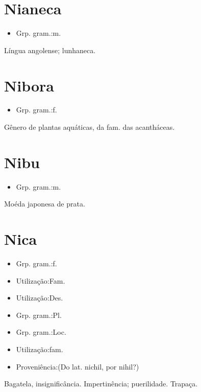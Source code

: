 \section{Nianeca}
\begin{itemize}
\item {Grp. gram.:m.}
\end{itemize}
Língua angolense; lunhaneca.
\section{Nibora}
\begin{itemize}
\item {Grp. gram.:f.}
\end{itemize}
Gênero de plantas aquáticas, da fam. das acantháceas.
\section{Nibu}
\begin{itemize}
\item {Grp. gram.:m.}
\end{itemize}
Moéda japonesa de prata.
\section{Nica}
\begin{itemize}
\item {Grp. gram.:f.}
\end{itemize}
\begin{itemize}
\item {Utilização:Fam.}
\end{itemize}
\begin{itemize}
\item {Utilização:Des.}
\end{itemize}
\begin{itemize}
\item {Grp. gram.:Pl.}
\end{itemize}
\begin{itemize}
\item {Grp. gram.:Loc.}
\end{itemize}
\begin{itemize}
\item {Utilização:fam.}
\end{itemize}
\begin{itemize}
\item {Proveniência:(Do lat. \textunderscore nichil\textunderscore , por \textunderscore nihil\textunderscore ?)}
\end{itemize}
Bagatela, insignificância.
Impertinência; puerilidade.
Trapaça.

